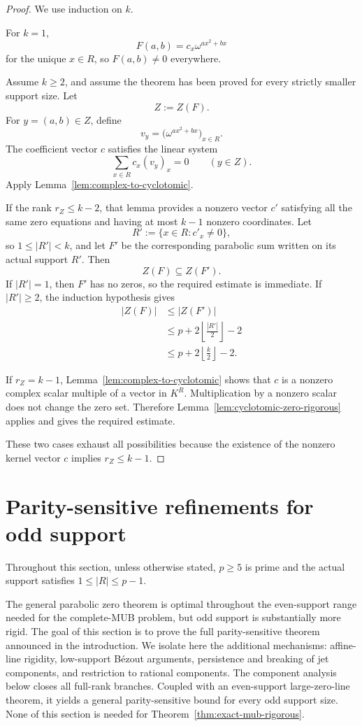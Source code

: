 \documentclass[11pt]{article}
\begin{document}
\begin{proof}
We use induction on \(k\).

For \(k=1\),
\[
 F(a,b)=c_x\omega^{a x^2+b x}
\]
for the unique \(x\in R\), so \(F(a,b)\ne0\) everywhere.

Assume \(k\ge2\), and assume the theorem has been proved for every
strictly smaller support size.  Let
\[
 Z:=Z(F).
\]
For \(y=(a,b)\in Z\), define
\[
 v_y=
 \bigl(\omega^{a x^2+b x}\bigr)_{x\in R}.
\]
The coefficient vector \(c\) satisfies the linear system
\[
 \sum_{x\in R}c_x(v_y)_x=0
 \qquad(y\in Z).
\]
Apply Lemma~\ref{lem:complex-to-cyclotomic}.

If the rank \(r_Z\le k-2\), that lemma provides a nonzero vector \(c'\)
satisfying all the same zero equations and having at most \(k-1\) nonzero
coordinates.  Let
\[
 R':=\{x\in R:c'_x\ne0\},
\]
so \(1\le |R'|<k\), and let \(F'\) be the corresponding parabolic sum
written on its actual support \(R'\).
Then
\[
 Z(F)\subseteq Z(F').
\]
If \(|R'|=1\), then \(F'\) has no zeros, so the required estimate is
immediate.  If \(|R'|\ge2\), the induction hypothesis gives
\[
 \begin{aligned}
 |Z(F)|
 &\le |Z(F')|\\
 &\le
 p+2\left\lfloor\frac{|R'|}{2}\right\rfloor-2\\
 &\le
 p+2\left\lfloor\frac{k}{2}\right\rfloor-2.
 \end{aligned}
\]

If \(r_Z=k-1\), Lemma~\ref{lem:complex-to-cyclotomic} shows that
\(c\) is a nonzero complex scalar multiple of a vector in \(K^R\).
Multiplication by a nonzero scalar does not change the zero set.
Therefore Lemma~\ref{lem:cyclotomic-zero-rigorous} applies and gives
the required estimate.

These two cases exhaust all possibilities because the existence of the
nonzero kernel vector \(c\) implies \(r_Z\le k-1\).
\end{proof}

\section{Parity-sensitive refinements for odd support}
\label{sec:odd-refinements}

Throughout this section, unless otherwise stated, $p\ge5$ is prime and the actual support satisfies $1\le |R|\le p-1$.

The general parabolic zero theorem is optimal throughout the even-support range needed for the complete-MUB problem, but odd support is substantially more rigid.  The goal of this section is to prove the full parity-sensitive theorem announced in the introduction.  We isolate here the additional mechanisms: affine-line rigidity, low-support B\'ezout arguments, persistence and breaking of jet components, and restriction to rational components.  The component analysis below closes all full-rank branches.  Coupled with an even-support large-zero-line theorem, it yields a general parity-sensitive bound for every odd support size.  None of this section is needed for Theorem~\ref{thm:exact-mub-rigorous}.
\end{document}
